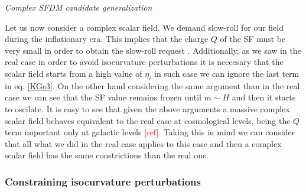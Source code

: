 \documentclass[amssymb,twocolumn,prd,nofootinbib,showpacs]{revtex4-1}
\begin{document}
\begin{center}
\textit{Complex SFDM candidate generalization}
\end{center}

Let us now consider a complex scalar field. %
We demand slow-roll for our field during the inflationary era. This implies that the charge $Q$ of the SF must be very small in order to obtain the slow-roll request \cite{atractorinf1,atractorinf12}. Additionally, as we saw in the real case in order to avoid isocurvature perturbations it is neccesary that the scalar field starts from a high value of $\eta_i$ in such case we can ignore the last term in eq. \eqref{KGe3}. On the other hand considering the same argument than in the real case we can see that the SF value remains frozen until $m\sim H$ and then it starts to oscilate. It is easy to see that given the above arguments a massive complex scalar field behaves equivalent to the real case at cosmological levels, being the $Q $ term important only at galactic levels \textcolor{red}{[ref]}. Taking this in mind we can consider that all what we did in the real case applies to this case and then a complex scalar field has the same constrictions than the real one. 


\subsubsection{Constraining isocurvature perturbations}
\end{document}
